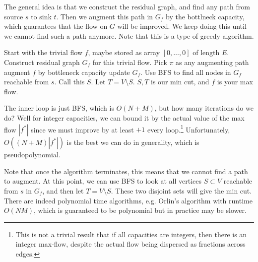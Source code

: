   \begin{algo}
    The general idea is that we construct the residual graph, and find any path from source $s$ to sink $t$. Then we augment this path in $G_f$ by the bottlneck capacity, which guarantees that the flow on $G$ will be improved. We keep doing this until we cannot find such a path anymore. Note that this is a type of greedy algorithm. 

    \begin{algorithm}[H]
      \label{alg:maxflow}
      \begin{algorithmic}
        \State 
        \State Start with the trivial flow $f$, maybe stored as array $[0, \ldots, 0]$ of length $E$. 
          \State Construct residual graph $G_f$ for this trivial flow. 
           
            \State Pick $\pi$ as any augmenting path 
            \State augment $f$ by bottleneck capacity 
            \State update $G_f$. 
          \EndWhile
          \State {}  
          \State Use BFS to find all nodes in $G_f$ reachable from $s$. Call this $S$.  
          \State Let $T = V \setminus S$.  
          \State $S, T$ is our min cut, and $f$ is your max flow. 
        \EndFunction
      \end{algorithmic}
    \end{algorithm}
    The inner loop is just BFS, which is $O(N + M)$, but how many iterations do we do? Well for integer capacities, we can bound it by the actual value of the max flow $|f^\ast|$ since we must improve by at least $+1$ every loop.\footnote{This is not a trivial result that if all capacities are integers, then there is an integer max-flow, despite the actual flow being dispersed as fractions across edges.} Unfortunately, $O((N+M) |f^\ast|)$ is the best we can do in generality, which is pseudopolynomial. 
  \end{algo}

  Note that once the algorithm terminates, this means that we cannot find a path to augment. At this point, we can use BFS to look at all vertices $S \subset V$ reachable from $s$ in $G_f$, and then let $T = V \setminus S$. These two disjoint sets will give the min cut. There are indeed polynomial time algorithms, e.g. Orlin's algorithm with runtime $O(NM)$, which is guaranteed to be polynomial but in practice may be slower. 

